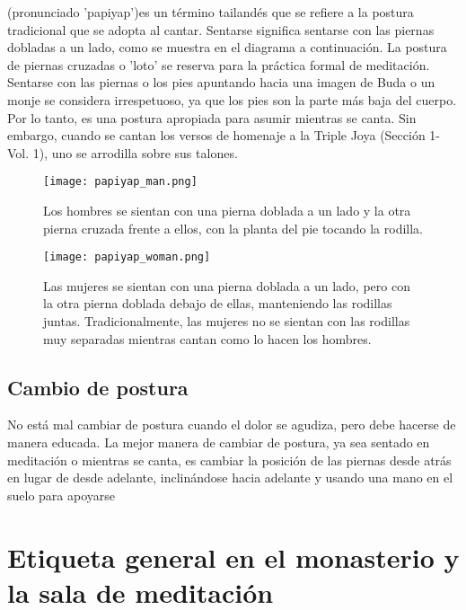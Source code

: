 \restoreFont{}

 \restoreFont{} (pronunciado 'papiyap')es un término tailandés que se refiere a la postura tradicional que se adopta al cantar. Sentarse  \restoreFont{} significa sentarse con las piernas dobladas a un lado, como se muestra en el diagrama a continuación. La postura de piernas cruzadas o 'loto' se reserva para la práctica formal de meditación. Sentarse con las piernas o los pies apuntando hacia una imagen de Buda o un monje se considera irrespetuoso, ya que los pies son la parte más baja del cuerpo. Por lo tanto,  \restoreFont{} es una postura apropiada para asumir mientras se canta. Sin embargo, cuando se cantan los versos de homenaje a la Triple Joya (Sección 1-Vol. 1), uno se arrodilla sobre sus talones. 
\begin{figure}[h]
	\centering
	
	\begin{minipage}{0.49\textwidth}
		\centering
		\texttt{[image: papiyap\_man.png]}
		\caption{Los hombres se sientan con una pierna doblada a un lado y la otra pierna cruzada frente a ellos, con la planta del pie tocando la rodilla.}
	\end{minipage}
	\hfill
	\begin{minipage}{0.49\textwidth}
		\centering
		\texttt{[image: papiyap\_woman.png]}
		\caption{Las mujeres se sientan con una pierna doblada a un lado, pero con la otra pierna doblada debajo de ellas, manteniendo las rodillas juntas. Tradicionalmente, las mujeres no se sientan con las rodillas muy separadas mientras cantan como lo hacen los hombres.}
	\end{minipage}
	
\end{figure}

\subsection{Cambio de postura}


No está mal cambiar de postura cuando el dolor se agudiza, pero debe hacerse de manera educada. La mejor manera de cambiar de postura, ya sea sentado en meditación o mientras se canta, es cambiar la posición de las piernas desde atrás en lugar de desde adelante, inclinándose hacia adelante y usando una mano en el suelo para apoyarse

\section{Etiqueta general en el monasterio y la sala de meditación}

